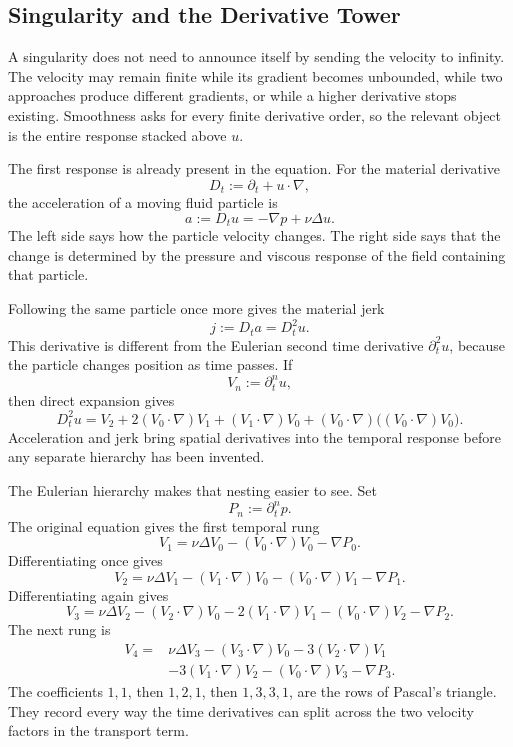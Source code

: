 \subsection{Singularity and the Derivative Tower}\label{sub:SingularityAndTheDerivativeTower}

A singularity does not need to announce itself by sending the velocity to infinity.
The velocity may remain finite while its gradient becomes unbounded, while two approaches produce different gradients, or while a higher derivative stops existing.
Smoothness asks for every finite derivative order, so the relevant object is the entire response stacked above \(u\).


The first response is already present in the equation.
For the material derivative
\[
  D_t:=\partial_t+u\cdot\nabla,
\]
the acceleration of a moving fluid particle is
\[
  a:=D_tu=-\nabla p+\nu\Delta u.
\]
The left side says how the particle velocity changes.
The right side says that the change is determined by the pressure and viscous response of the field containing that particle.

Following the same particle once more gives the material jerk
\[
  j:=D_ta=D_t^2u.
\]
This derivative is different from the Eulerian second time derivative \(\partial_t^2u\), because the particle changes position as time passes.
If
\[
  V_n:=\partial_t^n u,
\]
then direct expansion gives
\[
  D_t^2u
  =
  V_2
  +
  2(V_0\cdot\nabla)V_1
  +
  (V_1\cdot\nabla)V_0
  +
  (V_0\cdot\nabla)\bigl((V_0\cdot\nabla)V_0\bigr).
\]
Acceleration and jerk bring spatial derivatives into the temporal response before any separate hierarchy has been invented.

The Eulerian hierarchy makes that nesting easier to see.
Set
\[
  P_n:=\partial_t^n p.
\]
The original equation gives the first temporal rung
\[
  V_1
  =
  \nu\Delta V_0
  -(V_0\cdot\nabla)V_0
  -\nabla P_0.
\]
Differentiating once gives
\[
  V_2
  =
  \nu\Delta V_1
  -(V_1\cdot\nabla)V_0
  -(V_0\cdot\nabla)V_1
  -\nabla P_1.
\]
Differentiating again gives
\[
  V_3
  =
  \nu\Delta V_2
  -(V_2\cdot\nabla)V_0
  -2(V_1\cdot\nabla)V_1
  -(V_0\cdot\nabla)V_2
  -\nabla P_2.
\]
The next rung is
\[
  \begin{aligned}
  V_4
  ={}&
  \nu\Delta V_3
  -(V_3\cdot\nabla)V_0
  -3(V_2\cdot\nabla)V_1\\
  &-3(V_1\cdot\nabla)V_2
  -(V_0\cdot\nabla)V_3
  -\nabla P_3.
  \end{aligned}
\]
The coefficients \(1,1\), then \(1,2,1\), then \(1,3,3,1\), are the rows of Pascal's triangle.
They record every way the time derivatives can split across the two velocity factors in the transport term.

